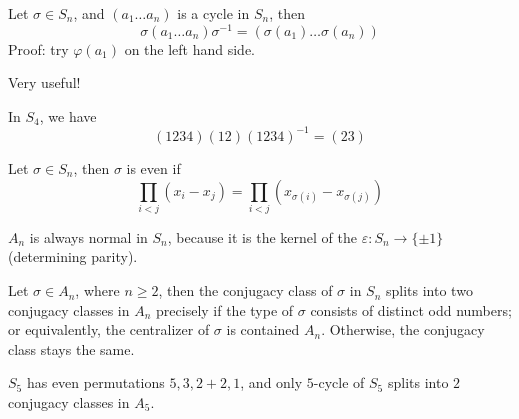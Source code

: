 \documentclass[openany]{book}
\begin{document}
\begin{prop}
    Let $\sigma\in S_n$, and $(a_1\dots a_n)$ is a cycle in $S_n$, then 
    \begin{equation*}
        \sigma(a_1\dots a_n)\sigma^{-1}=(\sigma(a_1)\dots\sigma(a_n))
    \end{equation*}
    Proof: try $\varphi(a_1)$ on the left hand side.
\end{prop}

\begin{warn}
    Very useful!
\end{warn}
\begin{example}
    In $S_4$, we have 
    \begin{equation*}
        (1234)(12)(1234)^{-1}=(23)
    \end{equation*}
\end{example}



\begin{defn}
    Let $\sigma\in S_n$, then $\sigma$ is even if 
    \begin{equation*}
        \prod_{i<j}(x_i-x_j)=\prod_{i<j}(x_{\sigma(i)}-x_{\sigma(j)})
    \end{equation*}
\end{defn}

\begin{prop}
    $A_n$ is always normal in $S_n$, because it is the kernel of the $\varepsilon: S_n\to\{\pm 1\}$ (determining parity).
\end{prop}


\begin{prop}
    Let $\sigma\in A_n$, where $n\geq 2$, then the conjugacy class of $\sigma$ in $S_n$ splits into two conjugacy classes in $A_n$ precisely if the type of $\sigma$ consists of distinct odd numbers; or equivalently, the centralizer of $\sigma$ is contained $A_n$. Otherwise, the conjugacy class stays the same.
\end{prop}
\begin{example}
    $S_5$ has even permutations $5, 3, 2+2, 1$, and only $5$-cycle of $S_5$ splits into $2$ conjugacy classes in $A_5$.
\end{example}
\end{document}
